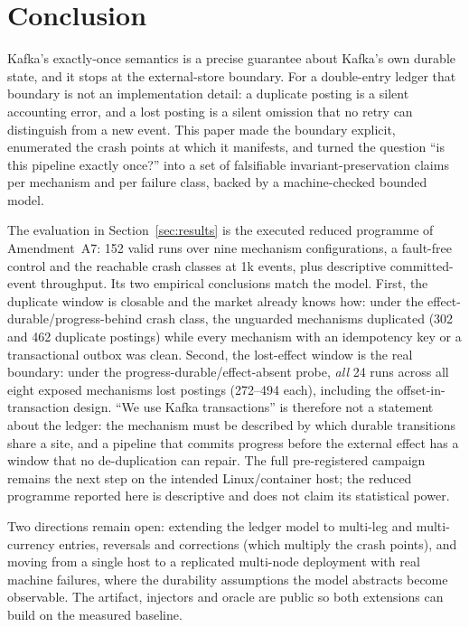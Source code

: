 \section{Conclusion}
\label{sec:conclusion}

Kafka's exactly-once semantics is a precise guarantee about Kafka's own durable state, and it
stops at the external-store boundary. For a double-entry ledger that boundary is not an
implementation detail: a duplicate posting is a silent accounting error, and a lost posting is a
silent omission that no retry can distinguish from a new event. This paper made the boundary
explicit, enumerated the crash points at which it manifests, and turned the question ``is this
pipeline exactly once?'' into a set of falsifiable invariant-preservation claims per mechanism
and per failure class, backed by a machine-checked bounded model.

The evaluation in Section~\ref{sec:results} is the executed reduced programme of Amendment~A7:
152 valid runs over nine mechanism configurations, a fault-free control and the reachable crash
classes at 1k events, plus descriptive committed-event throughput. Its two empirical conclusions
match the model. First, the duplicate window is closable and the market already knows how: under
the effect-durable/progress-behind crash class, the unguarded mechanisms duplicated (302 and 462
duplicate postings) while every mechanism with an idempotency key or a transactional outbox was
clean. Second, the lost-effect window is the real boundary: under the progress-durable/effect-absent
probe, \emph{all} 24 runs across all eight exposed mechanisms lost postings (272--494 each),
including the offset-in-transaction design. ``We use Kafka transactions'' is therefore not a
statement about the ledger: the mechanism must be described by which durable transitions share a
site, and a pipeline that commits progress before the external effect has a window that no
de-duplication can repair. The full pre-registered campaign remains the next step on the intended
Linux/container host; the reduced programme reported here is descriptive and does not claim its
statistical power.

Two directions remain open: extending the ledger model to multi-leg and multi-currency entries,
reversals and corrections (which multiply the crash points), and moving from a single host to a
replicated multi-node deployment with real machine failures, where the durability assumptions the
model abstracts become observable. The artifact, injectors and oracle are public so both
extensions can build on the measured baseline.

